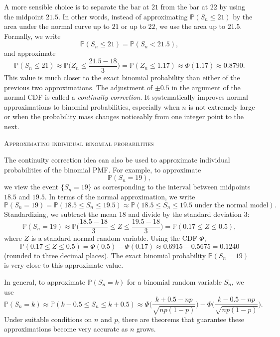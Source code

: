 A more sensible choice is to separate the bar at \(21\) from the bar at \(22\) by using the midpoint \(21.5\).  
In other words, instead of approximating \(\mathbb{P}(S_n \leq 21)\) by the area under the normal curve up to \(21\) or up to \(22\), we use the area up to \(21.5\).  
Formally, we write
\[
\mathbb{P}(S_n \leq 21)
=
\mathbb{P}(S_n < 21.5),
\]
and approximate
\[
\mathbb{P}(S_n \leq 21)
\approx
\mathbb{P}\Big(Z_n \leq \frac{21.5 - 18}{3}\Big)
=
\mathbb{P}(Z_n \leq 1.17)
\approx
\Phi(1.17)
\approx 0.8790.
\]
This value is much closer to the exact binomial probability than either of the previous two approximations.  
The adjustment of \(\pm 0.5\) in the argument of the normal CDF is called a \textit{continuity correction}.  
It systematically improves normal approximations to binomial probabilities, especially when \(n\) is not extremely large or when the probability mass changes noticeably from one integer point to the next.

\bigskip
\textsc{Approximating individual binomial probabilities}

The continuity correction idea can also be used to approximate individual probabilities of the binomial PMF.  
For example, to approximate
\[
\mathbb{P}(S_n = 19),
\]
we view the event \(\{S_n = 19\}\) as corresponding to the interval between midpoints \(18.5\) and \(19.5\).  
In terms of the normal approximation, we write
\[
\mathbb{P}(S_n = 19)
=
\mathbb{P}(18.5 \leq S_n \leq 19.5)
\approx
\mathbb{P}(18.5 \leq S_n \leq 19.5 \text{ under the normal model}).
\]
Standardizing, we subtract the mean \(18\) and divide by the standard deviation \(3\):
\[
\mathbb{P}(S_n = 19)
\approx
\mathbb{P}\Big(\frac{18.5 - 18}{3} \leq Z \leq \frac{19.5 - 18}{3}\Big)
=
\mathbb{P}(0.17 \leq Z \leq 0.5),
\]
where \(Z\) is a standard normal random variable.  
Using the CDF \(\Phi\),
\[
\mathbb{P}(0.17 \leq Z \leq 0.5)
=
\Phi(0.5) - \Phi(0.17)
\approx
0.6915 - 0.5675
=
0.1240
\]
(rounded to three decimal places).  
The exact binomial probability \(\mathbb{P}(S_n = 19)\) is very close to this approximate value.

In general, to approximate \(\mathbb{P}(S_n = k)\) for a binomial random variable \(S_n\), we use
\[
\mathbb{P}(S_n = k)
\approx
\mathbb{P}(k - 0.5 \leq S_n \leq k + 0.5)
\approx
\Phi\Big(\frac{k + 0.5 - np}{\sqrt{np(1-p)}}\Big)
-
\Phi\Big(\frac{k - 0.5 - np}{\sqrt{np(1-p)}}\Big).
\]
Under suitable conditions on \(n\) and \(p\), there are theorems that guarantee these approximations become very accurate as \(n\) grows.


